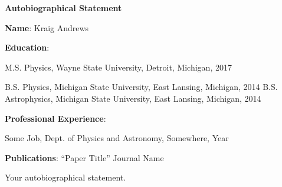 

\begin{center}

\textbf{Autobiographical Statement}
\end{center}
\noindent
\textbf{Name}:
\noindent
Kraig Andrews
\singlespacing

\noindent
\textbf{Education}:

\noindent
M.S. Physics, Wayne State University, Detroit, Michigan, 2017

\noindent
B.S. Physics, Michigan State University, East Lansing, Michigan, 2014
B.S. Astrophysics, Michigan State University, East Lansing, Michigan, 2014

\noindent
\textbf{Professional Experience}:

\noindent
Some Job, Dept. of Physics and Astronomy, Somewhere, Year

\noindent
\textbf{Publications}: ``Paper Title'' Journal Name

\doublespacing

\singlespacing
Your autobiographical statement.
